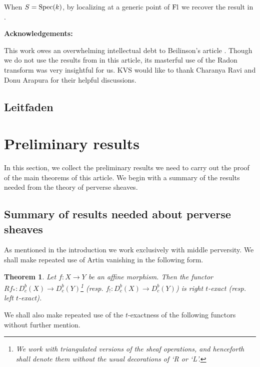 \documentclass[12pt, reqno]{amsart}
\theoremstyle{plain}
\newtheorem{thm}{\bf Theorem}[subsection]
\theoremstyle{definition}
\theoremstyle{definition}
\newcommand{\Spec}{{\rm Spec}}
\begin{document}
When $S=\Spec(k)$, by localizing at a generic point of $\textup{Fl}$ we recover the result in \cite[Theorem 4.1.1]{deCM10}.

{\bf Acknowledgements:}

This work owes an overwhelming intellectual debt to Beilinson's article \cite{Bei87}. Though we do not use the results from \cite{B} in this article, its masterful use of the Radon transform was very insightful for us. KVS would like to thank Charanya Ravi and Donu Arapura for their helpful discussions. 

\newpage 
\subsection{Leitfaden}

\begin{figure}[omitted: a diagram of this paper's results, not reproduced here]\end{figure}




\section{Preliminary results}

In this section, we collect the preliminary results we need to carry out the proof of the main theorems of this article. We begin with a summary of the results needed from the theory of perverse sheaves. 

\subsection{Summary of results needed about perverse sheaves}

As mentioned in the introduction we work exclusively with middle perversity. We shall make repeated use of Artin vanishing in the following form. 

\begin{thm}\cite[Theorem 4.1.1]{BBDG18}\label{Artin_Vanishing}
Let $f: X \to Y$ be an affine morphism. Then the functor $Rf_*: D^b_c(X) \to D^b_c(Y)$\footnote{We work with triangulated versions of the sheaf operations, and henceforth shall denote them without the usual decorations of ‘R or ‘L’.} (resp. $f_!: D^b_c(X) \to D^b_c(Y)$)  is right $t$-exact (resp. left $t$-exact).
\end{thm}


We shall also make repeated use of the $t$-exactness of the following functors without further mention.
\end{document}
